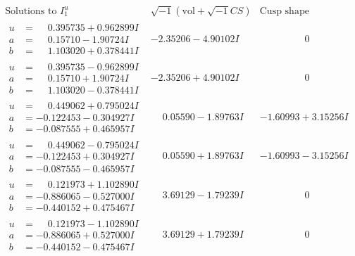 \documentclass[1p]{elsarticle_modified}
\theoremstyle{definition}
\newcommand{\I}{\sqrt{-1}}
\begin{document}
$$\begin{array}{c|c|c}  
\text{Solutions to }I^u_{1}& \I (\text{vol} + \sqrt{-1}CS) & \text{Cusp shape}\\
 \hline 
\begin{aligned}
u &= \phantom{-}0.395735 + 0.962899 I \\
a &= \phantom{-}0.15710 - 1.90724 I \\
b &= \phantom{-}1.103020 + 0.378441 I\end{aligned}
 & -2.35206 - 4.90102 I & \phantom{-0.000000 } 0 \\ \hline\begin{aligned}
u &= \phantom{-}0.395735 - 0.962899 I \\
a &= \phantom{-}0.15710 + 1.90724 I \\
b &= \phantom{-}1.103020 - 0.378441 I\end{aligned}
 & -2.35206 + 4.90102 I & \phantom{-0.000000 } 0 \\ \hline\begin{aligned}
u &= \phantom{-}0.449062 + 0.795024 I \\
a &= -0.122453 - 0.304927 I \\
b &= -0.087555 + 0.465957 I\end{aligned}
 & \phantom{-}0.05590 - 1.89763 I & -1.60993 + 3.15256 I \\ \hline\begin{aligned}
u &= \phantom{-}0.449062 - 0.795024 I \\
a &= -0.122453 + 0.304927 I \\
b &= -0.087555 - 0.465957 I\end{aligned}
 & \phantom{-}0.05590 + 1.89763 I & -1.60993 - 3.15256 I \\ \hline\begin{aligned}
u &= \phantom{-}0.121973 + 1.102890 I \\
a &= -0.886065 - 0.527000 I \\
b &= -0.440152 + 0.475467 I\end{aligned}
 & \phantom{-}3.69129 - 1.79239 I & \phantom{-0.000000 } 0 \\ \hline\begin{aligned}
u &= \phantom{-}0.121973 - 1.102890 I \\
a &= -0.886065 + 0.527000 I \\
b &= -0.440152 - 0.475467 I\end{aligned}
 & \phantom{-}3.69129 + 1.79239 I & \phantom{-0.000000 } 0 \\ \hline\begin{aligned}

\end{aligned}
\end{array}$$
\end{document}
